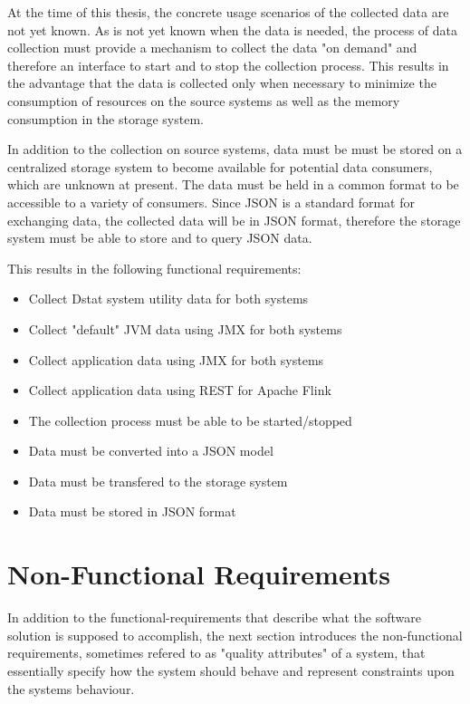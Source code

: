 At the time of this thesis, the concrete usage scenarios of the collected data are not yet known.
As is not yet known when the data is needed, the process of data collection must provide a mechanism
to collect the data "on demand" and therefore an interface to start and to stop the collection process.
This results in the advantage that the data is collected only when necessary to minimize the consumption
of resources on the source systems as well as the memory consumption in the storage system.

In addition to the collection on source systems, data must be must be stored on a centralized storage system
to become available for potential data consumers, which are unknown at present. The data must be held in a
common format to be accessible to a variety of consumers. Since JSON is a standard format for exchanging data,
the collected data will be in JSON format, therefore the storage system must be able to store and to query
JSON data.

This results in the following functional requirements:

\begin{itemize}
	\item Collect Dstat system utility data for both systems
	\item Collect "default" JVM data using JMX for both systems
	\item Collect application data using JMX for both systems
	\item Collect application data using REST for Apache Flink
	\item The collection process must be able to be started/stopped
	\item Data must be converted into a JSON model
	\item Data must be transfered to the storage system
	\item Data must be stored in JSON format
\end{itemize}

\section{Non-Functional Requirements}
\label{sec:nfr}

In addition to the functional-requirements that describe what the software solution is supposed
to accomplish, the next section introduces the non-functional requirements, sometimes refered to as
"quality attributes" of a system, that essentially specify how the system should behave and represent
constraints upon the systems behaviour.

